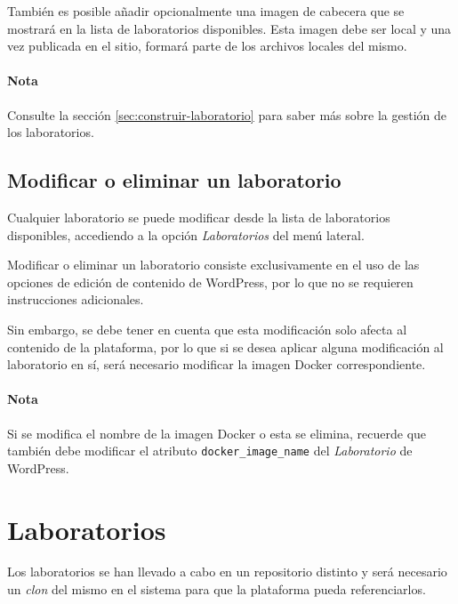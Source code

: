            También es posible añadir opcionalmente una imagen de cabecera que se mostrará en la lista de laboratorios disponibles. Esta imagen debe ser local y una vez publicada en el sitio, formará parte de los archivos locales del mismo.

            \paragraph{Nota}
            
                Consulte la sección \ref{sec:construir-laboratorio} para saber más sobre la gestión de los laboratorios.

        \subsection{Modificar o eliminar un laboratorio}

            Cualquier laboratorio se puede modificar desde la lista de laboratorios disponibles, accediendo a la opción \textit{Laboratorios} del menú lateral.

            Modificar o eliminar un laboratorio consiste exclusivamente en el uso de las opciones de edición de contenido de WordPress, por lo que no se requieren instrucciones adicionales.

            Sin embargo, se debe tener en cuenta que esta modificación solo afecta al contenido de la plataforma, por lo que si se desea aplicar alguna modificación al laboratorio en sí, será necesario modificar la imagen Docker correspondiente.

            \paragraph{Nota}

                Si se modifica el nombre de la imagen Docker o esta se elimina, recuerde que también debe modificar el atributo \texttt{docker\_image\_name} del \textit{Laboratorio} de WordPress.

            \newpage


    \section{Laboratorios}

        Los laboratorios se han llevado a cabo en un repositorio distinto y será necesario un \textit{clon} del mismo en el sistema para que la plataforma pueda referenciarlos.


